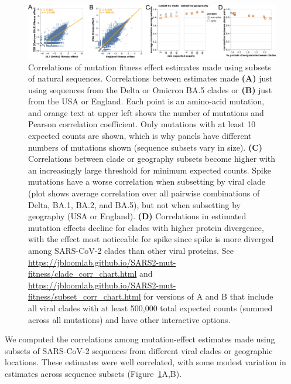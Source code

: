 \documentclass[9pt,twocolumn,twoside]{gsajnl_modified}
\begin{document}
\begin{figure}
\centering
\includegraphics[width=\linewidth]{figs/corr.png}
\caption{
Correlations of mutation fitness effect estimates made using subsets of natural sequences.
Correlations between estimates made {\bf (A)} just using sequences from the Delta or Omicron BA.5 clades or {\bf (B)} just from the USA or England.
Each point is an amino-acid mutation, and orange text at upper left shows the number of mutations and Pearson correlation coefficient.
Only mutations with at least 10 expected counts are shown, which is why panels have different numbers of mutations shown (sequence subsets vary in size).
{\bf (C)} Correlations between clade or geography subsets become higher with an increasingly large threshold for minimum expected counts.
Spike mutations have a worse correlation when subsetting by viral clade (plot shows average correlation over all pairwise combinations of Delta, BA.1, BA.2, and BA.5), but not when subsetting by geography (USA or England).
{\bf (D)} Correlations in estimated mutation effects decline for clades with higher protein divergence, with the effect most noticeable for spike since spike is more diverged among SARS-CoV-2 clades than other viral proteins.
See \url{https://jbloomlab.github.io/SARS2-mut-fitness/clade_corr_chart.html} and \url{https://jbloomlab.github.io/SARS2-mut-fitness/subset_corr_chart.html} for versions of A and B that include all viral clades with at least 500,000 total expected counts (summed across all mutations) and have other interactive options.
\label{fig:corr}
}
\end{figure}

We computed the correlations among mutation-effect estimates made using subsets of SARS-CoV-2 sequences from different viral clades or geographic locations.
These estimates were well correlated, with some modest variation in estimates across sequence subsets (Figure~\ref{fig:corr}A,B).
\end{document}
